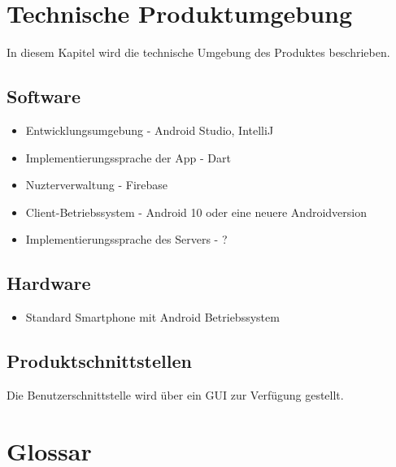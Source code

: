 \documentclass[parskip=full]{scrartcl}
\begin{document}
\section{Technische Produktumgebung}
In diesem Kapitel wird die technische Umgebung des Produktes beschrieben.

\subsection{Software}
\begin{itemize}
    \item Entwicklungsumgebung - Android Studio, IntelliJ
    \item Implementierungssprache der App - Dart
    \item Nuzterverwaltung - Firebase
    \item Client-Betriebssystem - Android 10 oder eine neuere Androidversion
    \item Implementierungssprache des Servers - ?
\end{itemize}

\subsection{Hardware}
\begin{itemize}
    \item Standard Smartphone mit Android Betriebssystem
\end{itemize}

\subsection{Produktschnittstellen}
Die Benutzerschnittstelle wird über ein GUI zur Verfügung gestellt.

\section{Glossar}
\end{document}
